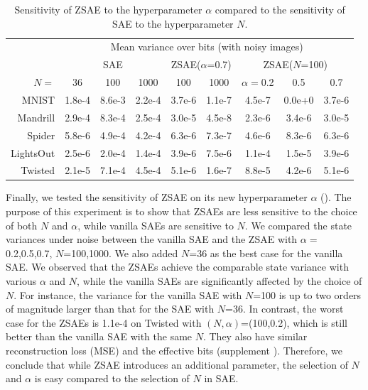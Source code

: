 \begin{table}[tb]
 \centering
 \begin{adjustbox}{width={\linewidth},keepaspectratio}
 \begin{tabular}{|r|*{8}{c|}}
     & \multicolumn{8}{c|}{Mean variance over bits (with noisy images)} \\
     & \multicolumn{3}{c|}{SAE} 
     & \multicolumn{2}{c|}{ZSAE($\alpha$=0.7)} 
     & \multicolumn{3}{c|}{ZSAE($N$=100)}
  \\
$N=$      &36     & 100    & 1000   & 100    & 1000   & $\alpha=$0.2 & 0.5    & 0.7    \\
MNIST     &1.8e-4 & 8.6e-3 & 2.2e-4 & 3.7e-6 & 1.1e-7 & 4.5e-7       & 0.0e+0 & 3.7e-6 \\
Mandrill  &2.9e-4 & 8.3e-4 & 2.5e-4 & 3.0e-5 & 4.5e-8 & 2.3e-6       & 3.4e-6 & 3.0e-5 \\
Spider    &5.8e-6 & 4.9e-4 & 4.2e-4 & 6.3e-6 & 7.3e-7 & 4.6e-6       & 8.3e-6 & 6.3e-6 \\
LightsOut &2.5e-6 & 2.0e-4 & 1.4e-4 & 3.9e-6 & 7.5e-6 & 1.1e-4       & 1.5e-5 & 3.9e-6 \\
Twisted   &2.1e-5 & 7.1e-4 & 4.5e-4 & 5.1e-6 & 1.6e-7 & 8.8e-5       & 4.2e-6 & 5.1e-6 \\
\end{tabular}
\end{adjustbox}
 \caption{Sensitivity of ZSAE to the hyperparameter $\alpha$ compared to the sensitivity of SAE to the hyperparameter $N$.}
 \label{sensitivity}
\end{table}

Finally, we tested the sensitivity of ZSAE on its new hyperparameter $\alpha$ ().
The purpose of this experiment is to show that ZSAEs are less sensitive to the choice of both $N$ and $\alpha$,
while vanilla SAEs are sensitive to $N$.
% 
We compared the state variances under noise
between the vanilla SAE and the ZSAE with $\alpha=$0.2,0.5,0.7, $N$=100,1000.
We also added $N$=36 as the best case for the vanilla SAE.
% 
We observed that the ZSAEs achieve the comparable state variance with various $\alpha$ and $N$,
while the vanilla SAEs are significantly affected by the choice of $N$.
For instance,
the variance for the vanilla SAE with $N$=100 is up to two orders of magnitude larger than that for the SAE with $N$=36.
In contrast,
the worst case for the ZSAEs is 1.1e-4 on Twisted with $(N,\alpha)$=(100,0.2),
which is still better than the vanilla SAE with the same $N$.
% 
They also have similar reconstruction loss (MSE) and the effective bits (supplement ).
Therefore, we conclude that while ZSAE introduces an additional parameter,
the selection of $N$ and $\alpha$ is easy compared to the selection of $N$ in SAE.

